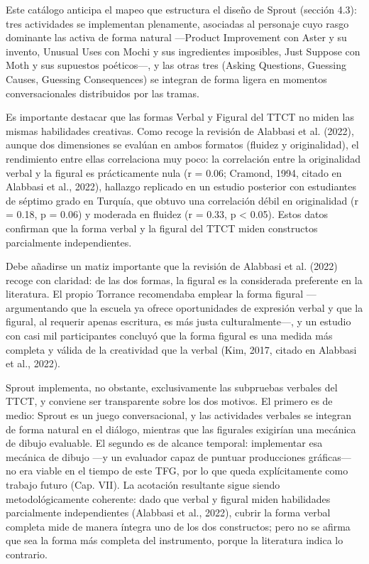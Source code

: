 \documentclass[12pt,twoside,titlepage]{report}
\begin{document}
Este catálogo anticipa el mapeo que estructura el diseño de Sprout (sección 4.3): tres actividades se implementan plenamente, asociadas al personaje cuyo rasgo dominante las activa de forma natural ---Product Improvement con Aster y su invento, Unusual Uses con Mochi y sus ingredientes imposibles, Just Suppose con Moth y sus supuestos poéticos---, y las otras tres (Asking Questions, Guessing Causes, Guessing Consequences) se integran de forma ligera en momentos conversacionales distribuidos por las tramas.

Es importante destacar que las formas Verbal y Figural del TTCT no miden las mismas habilidades creativas. Como recoge la revisión de Alabbasi et al. (2022), aunque dos dimensiones se evalúan en ambos formatos (fluidez y originalidad), el rendimiento entre ellas correlaciona muy poco: la correlación entre la originalidad verbal y la figural es prácticamente nula (r = 0.06; Cramond, 1994, citado en Alabbasi et al., 2022), hallazgo replicado en un estudio posterior con estudiantes de séptimo grado en Turquía, que obtuvo una correlación débil en originalidad (r = 0.18, p = 0.06) y moderada en fluidez (r = 0.33, p < 0.05). Estos datos confirman que la forma verbal y la figural del TTCT miden constructos parcialmente independientes.

Debe añadirse un matiz importante que la revisión de Alabbasi et al. (2022) recoge con claridad: de las dos formas, la figural es la considerada preferente en la literatura. El propio Torrance recomendaba emplear la forma figural ---argumentando que la escuela ya ofrece oportunidades de expresión verbal y que la figural, al requerir apenas escritura, es más justa culturalmente---, y un estudio con casi mil participantes concluyó que la forma figural es una medida más completa y válida de la creatividad que la verbal (Kim, 2017, citado en Alabbasi et al., 2022).

Sprout implementa, no obstante, exclusivamente las subpruebas verbales del TTCT, y conviene ser transparente sobre los dos motivos. El primero es de medio: Sprout es un juego conversacional, y las actividades verbales se integran de forma natural en el diálogo, mientras que las figurales exigirían una mecánica de dibujo evaluable. El segundo es de alcance temporal: implementar esa mecánica de dibujo ---y un evaluador capaz de puntuar producciones gráficas--- no era viable en el tiempo de este TFG, por lo que queda explícitamente como trabajo futuro (Cap. VII). La acotación resultante sigue siendo metodológicamente coherente: dado que verbal y figural miden habilidades parcialmente independientes (Alabbasi et al., 2022), cubrir la forma verbal completa mide de manera íntegra uno de los dos constructos; pero no se afirma que sea la forma más completa del instrumento, porque la literatura indica lo contrario.
\end{document}
